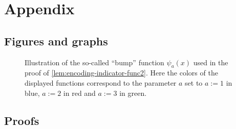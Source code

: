 \newpage
\appendix
\section{Appendix}
\subsection{Figures and graphs}
\begin{figure}[H]
    \centering
    
    \caption{Illustration of the so-called ``bump'' function $\psi_a(x)$ used in the proof of \cref{lem:encoding-indicator-func2}. Here the colors of the displayed functions correspond to the parameter $a$ set to $a:=1$ in blue, $a:=2$ in red and $a:=3$ in green.}
    \label{fig:bump_function}
\end{figure}

\subsection{Proofs}

